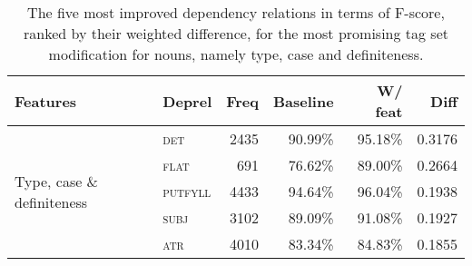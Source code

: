 \documentclass[a4paper,12pt,english]{book}
\begin{document}
\begin{table}
    \centering
    \smaller[0.5]
    \begin{tabular}{@{}llrrrr@{}}
        \toprule
        \textbf{Features} & \textbf{Deprel} & \textbf{Freq} &
        \textbf{Baseline} & \textbf{W/ feat} & \textbf{Diff} \\
        \midrule
        \multirow{5}{*}{Type, case \& definiteness}
        & \textsc{det} & 2435 & 90.99\% & 95.18\% & 0.3176 \\
        & \textsc{flat} & 691 & 76.62\% & 89.00\% & 0.2664 \\
        & \textsc{putfyll} & 4433 & 94.64\% & 96.04\% & 0.1938 \\
        & \textsc{subj} & 3102 & 89.09\% & 91.08\% & 0.1927 \\
        & \textsc{atr} & 4010 & 83.34\% & 84.83\% & 0.1855 \\
        \bottomrule
    \end{tabular}
    \caption{The five most improved dependency relations in terms of F-score,
        ranked by their weighted difference, for the most promising tag set
        modification for nouns, namely type, case and definiteness.}
    \label{substparseerror}
\end{table}

\end{document}
